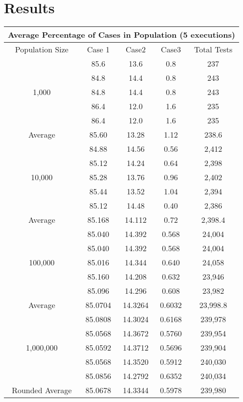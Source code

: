 \documentclass[letterpaper, 10pt]{article}
\begin{document}
\section{Results}

\begin{center}
\begin{tabular}{|c||c|c|c|c|}
    \hline
    \multicolumn{5}{|c|}{Average Percentage of Cases in Population (5 executions)} \\
    \hline
    Population Size & Case 1 & Case2 & Case3 & Total Tests\\
    \hline\hline
    \multirow{5}{*}{1,000} & 85.6 & 13.6 & 0.8 & 237 \\
    & 84.8 & 14.4 & 0.8 & 243 \\
    & 84.8 & 14.4 & 0.8 & 243 \\
    & 86.4 & 12.0 & 1.6 & 235 \\
    & 86.4 & 12.0 & 1.6 & 235 \\
    \hline
    Average & 85.60 & 13.28 & 1.12 & 238.6 \\
    \hline\hline
    \multirow{5}{*}{10,000} & 84.88 & 14.56 & 0.56 & 2,412 \\
    & 85.12 & 14.24 & 0.64 & 2,398 \\
    & 85.28 & 13.76 & 0.96 & 2,402 \\
    & 85.44 & 13.52 & 1.04 & 2,394 \\
    & 85.12 & 14.48 & 0.40 & 2,386 \\
    \hline
    Average & 85.168 & 14.112 & 0.72 & 2,398.4 \\
    \hline\hline
    \multirow{5}{*}{100,000} & 85.040 & 14.392 & 0.568 & 24,004 \\
    & 85.040 & 14.392 & 0.568 & 24,004 \\
    & 85.016 & 14.344 & 0.640 & 24,058 \\
    & 85.160 & 14.208 & 0.632 & 23,946 \\
    & 85.096 & 14.296 & 0.608 & 23,982 \\
    \hline
    Average & 85.0704 & 14.3264 & 0.6032 & 23,998.8 \\
    \hline\hline
    \multirow{5}{*}{1,000,000} & 85.0808 & 14.3024 & 0.6168 & 239,978 \\
    & 85.0568 & 14.3672 & 0.5760 & 239,954 \\
    & 85.0592 & 14.3712 & 0.5696 & 239,904 \\
    & 85.0568 & 14.3520 & 0.5912 & 240,030 \\
    & 85.0856 & 14.2792 & 0.6352 & 240,034 \\
    \hline
    Rounded Average & 85.0678 & 14.3344 & 0.5978 & 239,980 \\
    \hline
\end{tabular}
\end{center}
\end{document}
